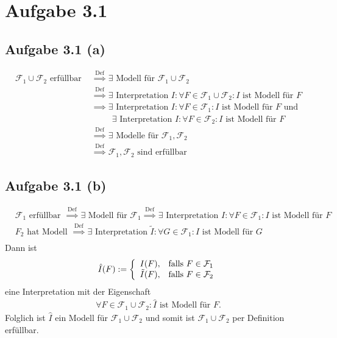 \documentclass[12pt,a4paper]{article}
\author{Willi Sontopski}
\newcommand{\F}{\mathcal{F}}
\begin{document}

\section*{Aufgabe 3.1}
\subsection*{Aufgabe 3.1 (a)}
\begin{align*}
\F_1\cup\F_2\text{ erfüllbar }
&\stackrel{\text{Def}}{\implies}
\exists\text{ Modell für }\F_1\cup\F_2\\
&\stackrel{\text{Def}}{\implies}
\exists\text{ Interpretation }I:\forall F\in\F_1\cup\F_2:I\text{ ist Modell für }F\\
&\implies
\exists\text{ Interpretation }I:\forall F\in\F_1:I\text{ ist Modell für }F\text{ und}\\
&\qquad~~\exists\text{ Interpretation }I:\forall F\in\F_2:I\text{ ist Modell für }F\\
&\stackrel{\text{Def}}{\implies}
\exists\text{ Modelle für }\F_1,\F_2\\
&\stackrel{\text{Def}}{\implies}
\F_1,\F_2\text{ sind erfüllbar}
\end{align*}

\subsection*{Aufgabe 3.1 (b)}
\begin{align*}
&\F_1\text{ erfüllbar }
\stackrel{\text{Def}}{\implies}
\exists\text{ Modell für }\F_1
\stackrel{\text{Def}}{\implies}
\exists\text{ Interpretation }I:\forall F\in\F_1:I\text{ ist Modell für }F\\
&F_2\text{ hat Modell }
\stackrel{\text{Def}}{\implies}
\exists\text{ Interpretation }\tilde{I}:\forall G\in\F_1:I\text{ ist Modell für }G\\
\end{align*}
Dann ist 
\begin{align*}
\hat{I}(F):=\left\lbrace\begin{array}{cl}
I(F), &\falls F\in\F_1\\
\tilde{I}(F), &\falls F\in\F_2
\end{array}\right.
\end{align*}
eine Interpretation mit der Eigenschaft
\begin{align*}
\forall F\in \F_1\cup\F_2:\hat{I}\text{ ist Modell für }F.
\end{align*}
Folglich ist $\hat{I}$ ein Modell für $\F_1\cup\F_2$ und somit ist  $\F_1\cup\F_2$ per Definition erfüllbar.
\end{document}
